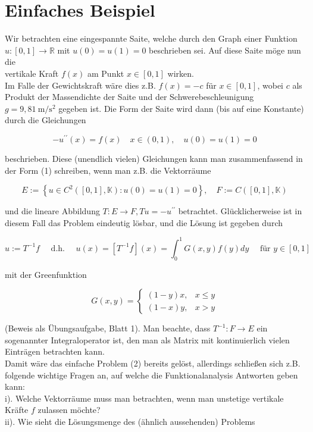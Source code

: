\documentclass[10pt, letterpaper]{article}
\begin{document}
\section*{Einfaches Beispiel}
Wir betrachten eine eingespannte Saite, welche durch den Graph einer Funktion $u:[0,1] \rightarrow \mathbb{R}$ mit $u(0)=u(1)=0$ beschrieben sei. Auf diese Saite möge nun die\\
vertikale Kraft $f(x)$ am Punkt $x \in[0,1]$ wirken.\\
Im Falle der Gewichtskraft wäre dies z.B. $f(x)=-c$ für $x \in[0,1]$, wobei $c$ als Produkt der Massendichte der Saite und der Schwerebeschleunigung $g=9,81 \mathrm{~m} / \mathrm{s}^{2}$ gegeben ist. Die Form der Saite wird dann (bis auf eine Konstante) durch die Gleichungen

$$
-u^{\prime \prime}(x)=f(x) \quad x \in(0,1), \quad u(0)=u(1)=0
$$

beschrieben. Diese (unendlich vielen) Gleichungen kann man zusammenfassend in der Form (1) schreiben, wenn man z.B. die Vektorräume

$$
E:=\left\{u \in C^{2}([0,1], \mathbb{K}): u(0)=u(1)=0\right\}, \quad F:=C([0,1], \mathbb{K})
$$

und die lineare Abbildung $T: E \rightarrow F, T u=-u^{\prime \prime}$ betrachtet. Glücklicherweise ist in diesem Fall das Problem eindeutig lösbar, und die Lösung ist gegeben durch

$$
u:=T^{-1} f \quad \text { d.h. } \quad u(x)=\left[T^{-1} f\right](x)=\int_{0}^{1} G(x, y) f(y) d y \quad \text { für } y \in[0,1]
$$

mit der Greenfunktion

$$
G(x, y)= \begin{cases}(1-y) x, & x \leq y \\ (1-x) y, & x>y\end{cases}
$$

(Beweis als Übungsaufgabe, Blatt 1). Man beachte, dass $T^{-1}: F \rightarrow E$ ein sogenannter Integraloperator ist, den man als Matrix mit kontinuierlich vielen Einträgen betrachten kann.\\
Damit wäre das einfache Problem (2) bereits gelöst, allerdings schließen sich z.B. folgende wichtige Fragen an, auf welche die Funktionalanalysis Antworten geben kann:\\
i). Welche Vektorräume muss man betrachten, wenn man unstetige vertikale Kräfte $f$ zulassen möchte?\\
ii). Wie sieht die Lösungsmenge des (ähnlich aussehenden) Problems
\end{document}
